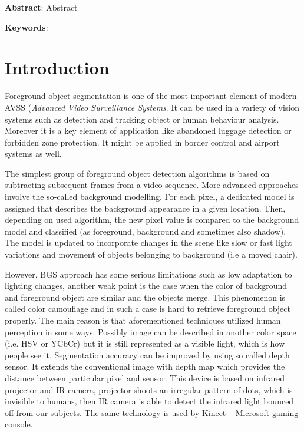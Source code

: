 \documentclass[b5paper,10pt,twoside]{article}
\begin{document}
\noindent
{\small \textbf{Abstract}: Abstract
\vspace{12pt}

\noindent
{\small \textbf{Keywords}: }


\section{Introduction}
\label{sec:introduction}

Foreground object segmentation is one of the most important element of modern AVSS (\textit{Advanced Video Surveillance Systems}. It can be used in a variety of vision systems such as detection and tracking object or human behaviour analysis. Moreover it is a key element of application like abandoned luggage detection or forbidden zone protection. It might be applied in border control and airport systems as well.


The simplest group of foreground object detection algorithms
is based on subtracting subsequent frames from a video
sequence. More advanced approaches involve the so-called
background modelling. For each pixel, a dedicated model is
assigned that describes the background appearance in a given
location. Then, depending on used algorithm, the new pixel
value is compared to the background model and classified
(as foreground, background and sometimes also shadow). The
model is updated to incorporate changes in the scene like slow
or fast light variations and movement of objects belonging to
background (i.e a moved chair).

However, BGS approach has some serious limitations such as low adaptation to lighting changes, another weak point is the case when the color of background and foreground object are similar and the objects merge. This phenomenon is called color camouflage and in such a case is hard to retrieve foreground object properly. The main reason is that aforementioned techniques utilized human perception in some ways. Possibly image can be described in another color space (i.e. HSV or YCbCr) but it is still represented as a visible light, which is how people see it. Segmentation accuracy can be improved by using so called depth sensor. It extends the conventional image with depth map which provides the distance between particular pixel and sensor. This device is based on infrared projector and IR camera, projector shoots an irregular pattern of dots, which is invisible to humans, then IR camera is able to detect the infrared light bounced off from our subjects. The same technology is used by Kinect -- Microsoft gaming console. 

}
\end{document}
